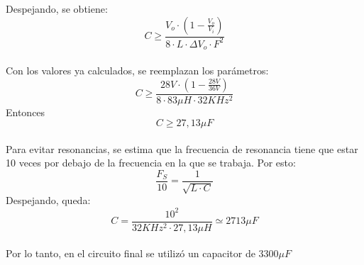                 Despejando, se obtiene:\\
                \begin{equation}
                    C \geq \frac{V_o \cdot  (1 - \frac{V_o}{V_i})}{8 \cdot L \cdot \Delta V_o \cdot F^2}
                \end{equation}\\
                Con los valores ya calculados, se reemplazan los parámetros:\\
                \begin{equation}
                    C \geq \frac{28V \cdot (1 - \frac{28V}{36V})}{8 \cdot 83 \mu H \cdot 32KHz^2}
                \end{equation}
                Entonces \[C \geq 27,13 \mu F\]\\
                Para evitar resonancias, se estima que la frecuencia de resonancia tiene que estar 10 veces por debajo de la frecuencia en la que se trabaja. Por esto:\\
                \begin{equation}
                    \frac{F_S}{10} = \frac{1}{\sqrt{L \cdot C}}
                \end{equation}
                Despejando, queda:\\
                \begin{equation}
                    C = \frac{10^2}{32KHz^2 \cdot 27,13 \mu H} \simeq 2713 \mu F
                \end{equation}\\
                Por lo tanto, en el circuito final se utilizó un capacitor de \textbf{$3300 \mu F$}

